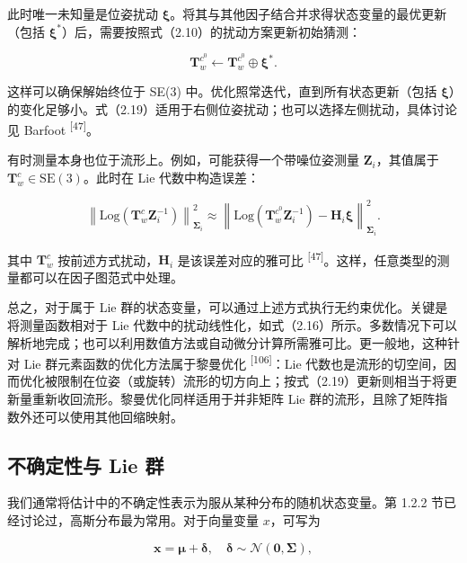 此时唯一未知量是位姿扰动 $\pmb\xi$。将其与其他因子结合并求得状态变量的最优更新（包括 $\pmb\xi^*$）后，需要按照式（2.10）的扰动方案更新初始猜测：

\begin{equation}
\boldsymbol {T} _ {w} ^ {c ^ {0}} \leftarrow \boldsymbol {T} _ {w} ^ {c ^ {0}} \oplus \boldsymbol {\xi} ^ {*}.\tag{2.19}
\end{equation}

这样可以确保解始终位于 SE(3) 中。优化照常迭代，直到所有状态更新（包括 $\pmb\xi$）的变化足够小。式（2.19）适用于右侧位姿扰动；也可以选择左侧扰动，具体讨论见 Barfoot \textsuperscript{[47]}。

有时测量本身也位于流形上。例如，可能获得一个带噪位姿测量 $\boldsymbol Z_i$，其值属于 $\pmb T_w^c\in\mathrm{SE}(3)$。此时在 Lie 代数中构造误差：

\begin{equation}
\left\| \mathrm{Log} \left(\pmb {T} _ {w} ^ {c} \pmb {Z} _ {i} ^ {- 1}\right) \right\| _ {\pmb {\Sigma} _ {i}} ^ {2} \approx \left\| \mathrm{Log} \left(\pmb {T} _ {w} ^ {c ^ {0}} \pmb {Z} _ {i} ^ {- 1}\right) - \pmb {H} _ {i} \pmb {\xi} \right\| _ {\pmb {\Sigma} _ {i}} ^ {2}.\tag{2.20}
\end{equation}

其中 $\pmb T_w^c$ 按前述方式扰动，$\pmb H_i$ 是该误差对应的雅可比 \textsuperscript{[47]}。这样，任意类型的测量都可以在因子图范式中处理。

总之，对于属于 Lie 群的状态变量，可以通过上述方式执行无约束优化。关键是将测量函数相对于 Lie 代数中的扰动线性化，如式（2.16）所示。多数情况下可以解析地完成；也可以利用数值方法或自动微分计算所需雅可比。更一般地，这种针对 Lie 群元素函数的优化方法属于黎曼优化 \textsuperscript{[106]}：Lie 代数也是流形的切空间，因而优化被限制在位姿（或旋转）流形的切方向上；按式（2.19）更新则相当于将更新量重新收回流形。黎曼优化同样适用于并非矩阵 Lie 群的流形，且除了矩阵指数外还可以使用其他回缩映射。

\subsection{不确定性与 Lie 群}

我们通常将估计中的不确定性表示为服从某种分布的随机状态变量。第 1.2.2 节已经讨论过，高斯分布最为常用。对于向量变量 $x$，可写为

\begin{equation}
\boldsymbol {x} = \boldsymbol {\mu} + \boldsymbol {\delta}, \quad \boldsymbol {\delta} \sim \mathcal {N} (\boldsymbol {0}, \boldsymbol {\Sigma}),\tag{2.21}
\end{equation}

